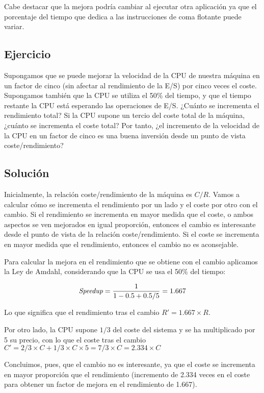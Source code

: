 \documentclass[12pt,onecolumn]{memoir}
\newenvironment{ejercicio}{%
    \def\FrameCommand{\fboxrule=\FrameRule\fboxsep=\FrameSep \fcolorbox{black}{metallic-green}}%
    \MakeFramed {\FrameRestore}}%
{\endMakeFramed}
\begin{document}
Cabe destacar que la mejora podría cambiar al ejecutar otra aplicación
ya que el porcentaje del tiempo que dedica a las instrucciones de coma
flotante puede variar.

\begin{ejercicio}

\subsection*{Ejercicio}

Supongamos que se puede mejorar la velocidad de la CPU
de nuestra máquina en un factor de cinco (sin afectar al
rendimiento de la E/S) por cinco veces el coste. Supongamos
también que la CPU se utiliza el 50\% del tiempo, y que el tiempo
restante la CPU está esperando las operaciones de E/S. ¿Cuánto se
incrementa el rendimiento total? Si la CPU supone un tercio del 
coste total de la máquina, ¿cuánto se incrementa el coste total? 
Por tanto, ¿el incremento de la velocidad de la CPU en un factor 
de cinco es una buena inversión desde un punto de vista 
coste/rendimiento?

\subsection*{Solución}

Inicialmente, la relación coste/rendimiento de la máquina es $C/R$. Vamos a calcular cómo se incrementa el rendimiento por un lado y el coste por otro con el cambio. Si el rendimiento se incrementa en mayor medida que el coste, o ambos aspectos se ven mejorados en igual proporción, entonces el cambio es interesante desde el punto de vista de la relación coste/rendimiento. Si el coste se incrementa en mayor medida que el rendimiento, entonces el cambio no es aconsejable.

Para calcular la mejora en el rendimiento que se obtiene con el cambio aplicamos la Ley de Amdahl, considerando que la CPU se usa el 50\% del tiempo: 

\[\emph{Speedup} = \frac{1}{1-0.5 + 0.5/5} = 1.667\]

Lo que significa que el rendimiento tras el cambio $R' = 1.667 \times R$.

Por otro lado, la CPU supone $1/3$ del coste del sistema y se ha multiplicado por 5 su precio, con lo que el coste tras el cambio $C' = 2/3 \times C + 1/3 \times C \times 5 = 7/3 \times C = 2.334 \times C$

Concluimos, pues, que el cambio no es interesante, ya que el coste se incrementa en mayor proporción que el rendimiento (incremento de 2.334 veces en el coste para obtener un factor de mejora en el rendimiento de 1.667).

\end{ejercicio}
\end{document}
